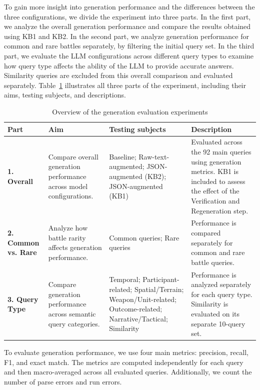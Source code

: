 To gain more insight into generation performance and the differences between the three configurations, we divide the experiment into three parts. In the first part, we analyze the overall generation performance and compare the results obtained using KB1 and KB2. In the second part, we analyze generation performance for common and rare battles separately, by filtering the initial query set. In the third part, we evaluate the LLM configurations across different query types to examine how query type affects the ability of the LLM to provide accurate answers. Similarity queries are excluded from this overall comparison and evaluated separately. Table~\ref{tab:generation_experiment_parts} illustrates all three parts of the experiment, including their aims, testing subjects, and descriptions.
\begin{table}[htbp]
    \centering
    \caption{Overview of the generation evaluation experiments}
    \label{tab:generation_experiment_parts}

    \small
    \renewcommand{\arraystretch}{1.5}
    \setlength{\tabcolsep}{4pt}

    \begin{tabular}{
        >{\raggedright\arraybackslash}p{}
        >{\raggedright\arraybackslash}p{}
        >{\raggedright\arraybackslash}p{}
        >{\raggedright\arraybackslash}p{}
    }
        \toprule
        \textbf{Part} &
        \textbf{Aim} &
        \textbf{Testing subjects} &
        \textbf{Description} \\
        \midrule

        \textbf{1. Overall} &
        Compare overall generation performance across model configurations. &
        Baseline; Raw-text-augmented; JSON-augmented (KB2);
        JSON-augmented (KB1) &
        Evaluated across the 92 main queries using generation metrics.
        KB1 is included to assess the effect of the Verification
        and Regeneration step. \\
        \midrule

        \textbf{2. Common vs. Rare} &
        Analyze how battle rarity affects generation performance. &
        Common queries; Rare queries &
        Performance is compared separately for common and
        rare battle queries. \\
        \midrule

        \textbf{3. Query Type} &
        Compare generation performance across semantic query categories. &
        Temporal; Participant-related; Spatial/Terrain;
        Weapon/Unit-related; Outcome-related; Narrative/Tactical;
        Similarity &
        Performance is analyzed separately for each query type.
        Similarity is evaluated on its separate 10-query set. \\

        \bottomrule
    \end{tabular}
\end{table}
To evaluate generation performance, we use four main metrics: precision, recall, F1, and exact match. The metrics are computed independently for each query and then macro-averaged across all evaluated queries. Additionally, we count the number of parse errors and run errors.

